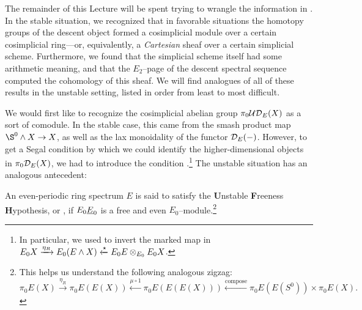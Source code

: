 The remainder of this Lecture will be spent trying to wrangle the information in .  In the stable situation, we recognized that in favorable situations the homotopy groups of the descent object formed a cosimplicial module over a certain cosimplicial ring---or, equivalently, a \emph{Cartesian} sheaf over a certain simplicial scheme.  Furthermore, we found that the simplicial scheme itself had some arithmetic meaning, and that the \(E_2\)--page of the descent spectral sequence computed the cohomology of this sheaf.  We will find analogues of all of these results in the unstable setting, listed in order from least to most difficult.

We would first like to recognize the cosimplicial abelian group \(\pi_0 \mathcal{UD}_E(X)\) as a sort of comodule.  In the stable case, this came from the smash product map \(\S^0 \sm X \to X\), as well as the lax monoidality of the functor \(\mathcal{D}_E(-)\).  However, to get a Segal condition by which we could identify the higher-dimensional objects in \(\pi_0 \mathcal{D}_E(X)\), we had to introduce the condition .\footnote{In particular, we used {\FH} to invert the marked map in \(E_0 X \xrightarrow{\eta_R} E_0(E \wedge X) \xleftarrow{\star} E_0 E \otimes_{E_0} E_0 X\).}  The unstable situation has an analogous antecedent:

\begin{definition}
An even-periodic ring spectrum \(E\) is said to satisfy the \textbf{U}nstable \textbf{F}reeness \textbf{H}ypothesis, or \UFH, if \(E_0 \OS{E}{0}\) is a free and even \(E_0\)--module.\footnote{This helps us understand the following analogous zigzag: \[\pi_0 E(X) \xrightarrow{\eta_R} \pi_0 E(E(X)) \xleftarrow{\mu \circ 1} \pi_0 E(E(E(X))) \xleftarrow{\mathrm{compose}} \pi_0 E(E(S^0)) \times \pi_0 E(X).\]}
\end{definition}


